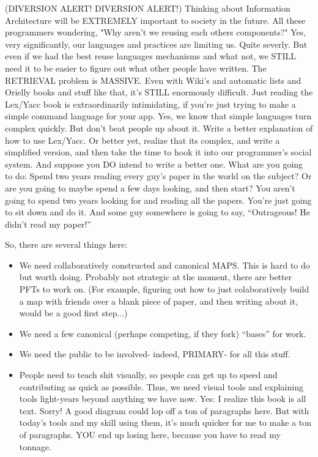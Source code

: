 \documentclass[oneside]{book}
\begin{document}
(DIVERSION ALERT! DIVERSION ALERT!)
Thinking about Information Architecture will be EXTREMELY important to
society in the future. All these programmers wondering, "Why aren't we
reusing each others components?" Yes, very significantly, our
languages and practices are limiting us. Quite severly. But even if we
had the best reuse languages mechanisms and what not, we STILL need it
to be easier to figure out what other people have written. The
RETRIEVAL problem is MASSIVE. Even with Wiki's and automatic lists and
Orielly books and stuff like that, it's STILL enormously
difficult. Just reading the Lex/Yacc book is extraordinarily
intimidating, if you're just trying to make a simple command language
for your app. Yes, we know that simple languages turn complex
quickly. But don't beat people up about it. Write a better explanation
of how to use Lex/Yacc. Or better yet, realize that its complex, and
write a simplified version, and then take the time to hook it into our
programmer's social system. And suppose you DO intend to write a
better one. What are you going to do: Spend two years reading every
guy's paper in the world on the subject? Or are you going to maybe
spend a few days looking, and then start? You aren't going to spend
two years looking for and reading all the papers. You're just going to
sit down and do it. And some guy somewhere is going to say,
``Outrageous! He didn't read my paper!''

So, there are several things here:
\begin{itemize}
\item We need collaboratively constructed and canonical MAPS. This is hard
to do but worth doing. Probably not strategic at the moment, there are
better PFTs to work on. (For example, figuring out how to just
colaboratively build a map with friends over a blank piece of paper,
and then writing about it, would be a good first step...)
\item We need a few canonical (perhaps competing, if they fork) ``bases''
for work.
\item We need the public to be involved- indeed, PRIMARY- for all this
stuff.
\item People need to teach shit visually, so people can get up to speed
and contributing as quick as possible. Thus, we need visual tools
and explaining tools light-years beyond anything we have now. Yes: I
realize this book is all text. Sorry! A good diagram could lop off a
ton of paragraphs here. But with today's tools and my skill using
them, it's much quicker for me to make a ton of paragraphs. YOU end up
losing here, because you have to read my tonnage.
\end{itemize}
\end{document}
